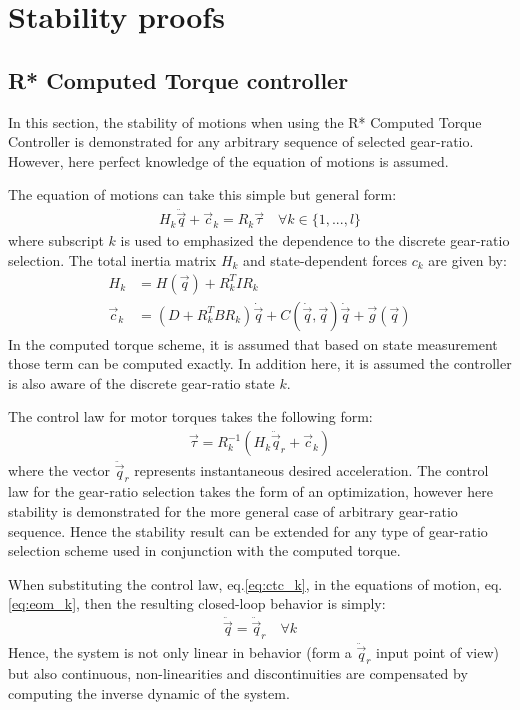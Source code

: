 \newpage
\section{Stability proofs}
\label{sec:stabproofs}

 
\subsection{R* Computed Torque controller}
\label{sec:stabrstar1}

In this section, the stability of motions when using the R* Computed Torque Controller is demonstrated for any arbitrary sequence of selected gear-ratio. However, here perfect knowledge of the equation of motions is assumed.

The equation of motions can take this simple but general form:
\begin{align}
H_k \ddot{\vec{q}} + \vec{c}_k = R_k \vec{\tau} \quad \forall k \in \{1,...,l\}
\label{eq:eom_k}
\end{align}
where subscript $k$ is used to emphasized the dependence to the discrete gear-ratio selection. The total inertia matrix $H_k$ and state-dependent forces $c_k$ are given by:
\begin{align}
H_k       &= H(\vec{q}) + R_k^T I R_k \\
\vec{c}_k &= \left( D + R_k^T B R_k \right) \dot{\vec{q}} + C( \dot{\vec{q}} , \vec{q} ) \dot{\vec{q}} + \vec{g}(\vec{q})
\end{align}
In the computed torque scheme, it is assumed that based on state measurement those term can be computed exactly. In addition here, it is assumed the controller is also aware of the discrete gear-ratio state $k$.

The control law for motor torques takes the following form:
\begin{align}
\vec{\tau} = R_k^{-1} \left( H_k \ddot{\vec{q}}_r + \vec{c}_k \right) 
\label{eq:ctc_k}
\end{align}
where the vector $\ddot{\vec{q}}_r$ represents instantaneous desired acceleration. The control law for the gear-ratio selection takes the form of an optimization, however here stability is demonstrated for the more general case of arbitrary gear-ratio sequence. Hence the stability result can be extended for any type of gear-ratio selection scheme used in conjunction with the computed torque. 

When substituting the control law, eq.\eqref{eq:ctc_k}, in the equations of motion, eq.\eqref{eq:eom_k}, then the resulting closed-loop behavior is simply:
\begin{align}
\ddot{\vec{q}} = \ddot{\vec{q}}_r \quad \forall k
\label{eq:cl_k}
\end{align}
Hence, the system is not only linear in behavior (form a $\ddot{\vec{q}}_r$ input point of view) but also continuous, non-linearities and discontinuities are compensated by computing the inverse dynamic of the system.

